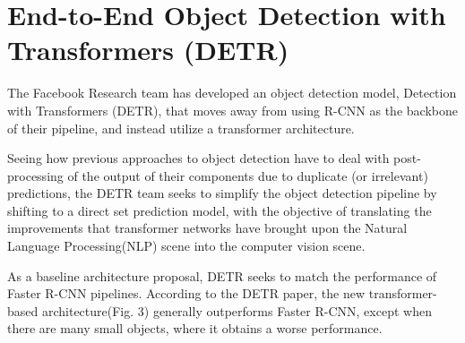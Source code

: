 \documentclass[10pt,a4paper,twocolumn,twoside]{article}
\begin{document}
\section{End-to-End Object Detection with Transformers (DETR)}

The Facebook Research team has developed an object detection model, Detection with Transformers (DETR)\cite{carion_massa_synnaeve_usunier_kirillov_zagoruyko_2020}, that moves away from using R-CNN as the backbone of their pipeline, and instead utilize a transformer architecture. 

Seeing how previous approaches to object detection have to deal with post-processing of the output of their components due to duplicate (or irrelevant) predictions, the DETR team seeks to simplify the object detection pipeline by shifting to a direct set prediction model, with the objective of translating the improvements that transformer networks have brought upon the Natural Language Processing(NLP) scene into the computer vision scene. 


As a baseline architecture proposal, DETR seeks to match the performance of Faster R-CNN pipelines. According to the DETR paper, the new transformer-based architecture(Fig. 3) generally outperforms Faster R-CNN, except when there are many small objects, where it obtains a worse performance.




\printbibliography
\end{document}
